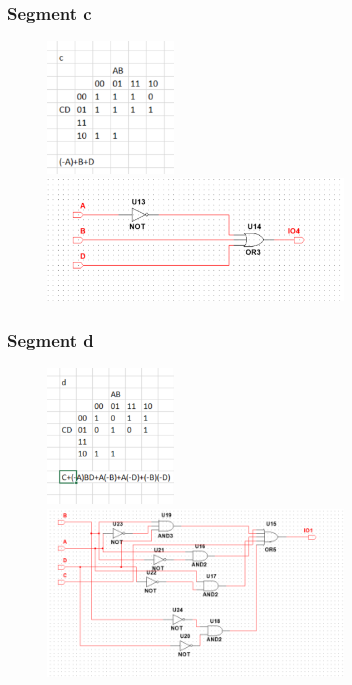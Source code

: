\documentclass[12pt,a4paper]{article}
\begin{document}
\subsubsection{Segment c}
\begin{figure}[H]
\centering
\includegraphics[width=0.3\textwidth]{7seg/seg2}
\includegraphics[width=0.7\textwidth]{7seg/seg2circ}
\end{figure}

\newpage
\subsubsection{Segment d}
\begin{figure}[H]
\centering
\includegraphics[width=0.3\textwidth]{7seg/seg3}
\includegraphics[width=0.7\textwidth]{7seg/seg3circ}
\end{figure}
\end{document}
